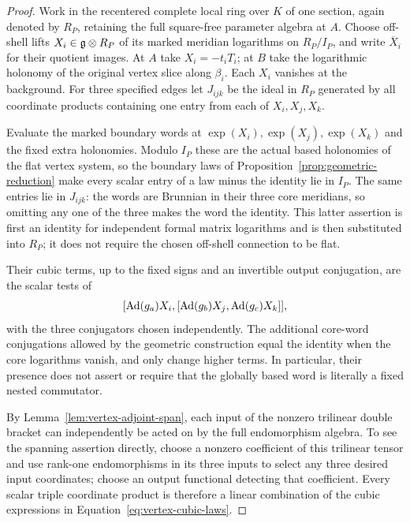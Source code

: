 \begin{proof}
Work in the recentered complete local ring over $K$ of one section,
again denoted by $R_P$, retaining the full square-free parameter
algebra at $A$.  Choose off-shell lifts
$X_i\in\mathfrak{g}\otimes R_P$ of its marked meridian logarithms on
$R_P/I_P$, and write $\overline X_i$ for their quotient images.
At $A$ take $X_i=-t_iT_i$; at $B$ take the logarithmic holonomy of
the original vertex slice along $\beta_i$.  Each $X_i$ vanishes at
the background.  For three specified edges let $J_{ijk}$ be the ideal
in $R_P$ generated by all coordinate products containing one entry
from each of $X_i,X_j,X_k$.

Evaluate the marked boundary words at $\exp(X_i),\exp(X_j),\exp(X_k)$
and the fixed extra holonomies.  Modulo $I_P$ these are the actual
based holonomies of the flat vertex system, so the boundary laws of
Proposition~\ref{prop:geometric-reduction} make every scalar entry of a
law minus the identity lie in $I_P$.  The same entries lie in $J_{ijk}$:
the words are Brunnian in their three core meridians, so omitting any
one of the three makes the word the identity.  This latter assertion
is first an identity for independent formal matrix logarithms and is
then substituted into $R_P$; it does not require the chosen off-shell
connection to be flat.

Their cubic terms, up to the fixed signs and an invertible output
conjugation, are the scalar tests of
\begin{equation}
\label{eq:vertex-cubic-laws}
 [\operatorname{Ad}(g_a)X_i,[\operatorname{Ad}(g_b)X_j,\operatorname{Ad}(g_c)X_k]],
\end{equation}
with the three conjugators chosen independently.  The additional
core-word conjugations allowed by the geometric construction equal
the identity when the core logarithms vanish, and only change higher
terms.  In particular, their presence does not assert or require that
the globally based word is literally a fixed nested commutator.

By Lemma~\ref{lem:vertex-adjoint-span}, each input of the nonzero
trilinear double bracket can independently be acted on by the full
endomorphism algebra.  To see the spanning assertion directly, choose
a nonzero coefficient of this trilinear tensor and use rank-one
endomorphisms in its three inputs to select any three desired input
coordinates; choose an output functional detecting that coefficient.
Every scalar triple coordinate product is therefore a linear
combination of the cubic expressions in Equation~\eqref{eq:vertex-cubic-laws}.


\end{proof}
